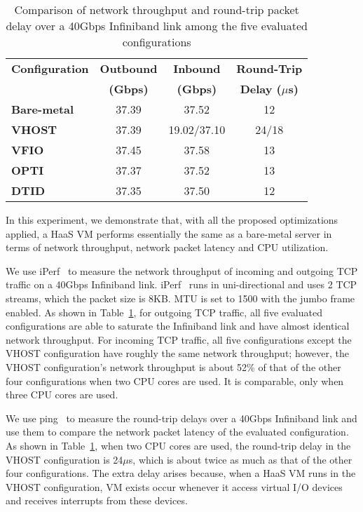 
\begin{table}
\renewcommand{\arraystretch}{1.2}
\small
\begin{center}
\begin{tabular}{|l|c|c|c|} \hline
{\bf Configuration} & {\bf Outbound} & {\bf Inbound} & {\bf Round-Trip} \\
                    & {\bf (Gbps)}   & {\bf (Gbps)}  & {\bf Delay ($\mu$s)} \\ \hline
{\bf Bare-metal} & 37.39 & 37.52 & 12 \\ \hline
{\bf VHOST}      & 37.39 & 19.02/37.10 & 24/18\\ \hline
{\bf VFIO}       & 37.45 & 37.58 & 13 \\ \hline
{\bf OPTI}       & 37.37 & 37.52 & 13 \\ \hline
{\bf DTID}       & 37.35 & 37.50 & 12 \\ \hline
\end{tabular}
\end{center}
\vspace{-0.1in}
\caption{Comparison of network throughput and round-trip
packet delay over a 40Gbps Infiniband link among the five
evaluated configurations}
\label{tab:network_performance}
\vspace{-0.1in}
\end{table}

In this experiment, we demonstrate that, with all the proposed
optimizations applied, a HaaS VM performs essentially the same
as a bare-metal server in terms of network throughput, network
packet latency and CPU utilization.

We use iPerf~\cite{iperf} to measure the network throughput of
incoming and outgoing TCP traffic on a 40Gbps Infiniband link.
iPerf~\cite{iperf} runs in uni-directional and uses 2 TCP
streams, which the packet size is 8KB. MTU is set to 1500 with
the jumbo frame enabled. As shown in
Table~\ref{tab:network_performance}, for outgoing TCP traffic,
all five evaluated configurations are able to saturate the
Infiniband link and have almost identical network throughput.
For incoming TCP traffic, all five configurations except the
VHOST configuration have roughly the same network throughput;
however, the VHOST configuration's network throughput is about
52\% of that of the other four configurations when two CPU
cores are used. It is comparable, only when three CPU cores
are used.

We use ping~\cite{ping} to measure the round-trip delays over
a 40Gbps Infiniband link and use them to compare the network
packet latency of the evaluated configuration. As shown in
Table~\ref{tab:network_performance}, when two CPU cores are
used, the round-trip delay in the VHOST configuration is
24$\mu$s, which is about twice as much as that of the other
four configurations. The extra delay arises because, when a
HaaS VM runs in the VHOST configuration, VM exists occur
whenever it access virtual I/O devices and receives interrupts
from these devices.


